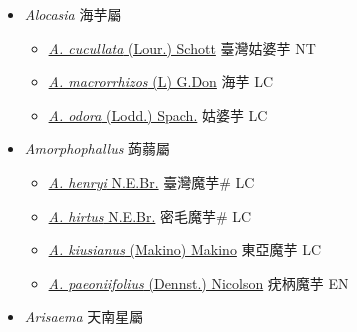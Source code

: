 
  \begin{itemize}
 \item[] \textit{Alocasia} 海芋屬
                    
  \begin{itemize}
        \item[] \href{http://www.theplantlist.org/tpl1.1/search?q=Alocasia+cucullata}{\textit{A. cucullata} (Lour.) Schott}   臺灣姑婆芋 NT
        \item[] \href{http://www.theplantlist.org/tpl1.1/search?q=Alocasia+macrorrhizos}{\textit{A. macrorrhizos} (L) G.Don}   海芋 LC
        \item[] \href{http://www.theplantlist.org/tpl1.1/search?q=Alocasia+odora}{\textit{A. odora} (Lodd.) Spach.}   姑婆芋 LC
  \end{itemize}
 \item[] \textit{Amorphophallus} 蒟蒻屬
                    
  \begin{itemize}
        \item[] \href{http://www.theplantlist.org/tpl1.1/search?q=Amorphophallus+henryi}{\textit{A. henryi} N.E.Br.}   臺灣魔芋\# LC
        \item[] \href{http://www.theplantlist.org/tpl1.1/search?q=Amorphophallus+hirtus}{\textit{A. hirtus} N.E.Br.}   密毛魔芋\# LC
        \item[] \href{http://www.theplantlist.org/tpl1.1/search?q=Amorphophallus+kiusianus}{\textit{A. kiusianus} (Makino) Makino}   東亞魔芋 LC
        \item[] \href{http://www.theplantlist.org/tpl1.1/search?q=Amorphophallus+paeoniifolius}{\textit{A. paeoniifolius} (Dennst.) Nicolson}   疣柄魔芋 EN
  \end{itemize}
 \item[] \textit{Arisaema} 天南星屬
                    

\end{itemize}
